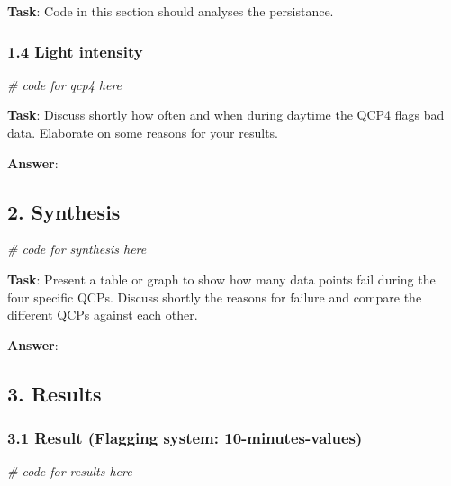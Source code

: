 \documentclass[
]{article}
\newenvironment{Shaded}{\begin{snugshade}}{\end{snugshade}}
\newcommand{\CommentTok}[1]{\textcolor[rgb]{0.56,0.35,0.01}{\textit{#1}}}
\begin{document}
\textbf{Task}: Code in this section should analyses the persistance.

\hypertarget{light-intensity}{%
\subsubsection{1.4 Light intensity}\label{light-intensity}}

\begin{Shaded}
\begin{Highlighting}[]
\CommentTok{\# code for qcp4 here}
\end{Highlighting}
\end{Shaded}

\textbf{Task}: Discuss shortly how often and when during daytime the
QCP4 flags bad data. Elaborate on some reasons for your results.

\textbf{Answer}:

\hypertarget{synthesis}{%
\subsection{2. Synthesis}\label{synthesis}}

\begin{Shaded}
\begin{Highlighting}[]
\CommentTok{\# code for synthesis here}
\end{Highlighting}
\end{Shaded}

\textbf{Task}: Present a table or graph to show how many data points
fail during the four specific QCPs. Discuss shortly the reasons for
failure and compare the different QCPs against each other.

\textbf{Answer}:

\hypertarget{results}{%
\subsection{3. Results}\label{results}}

\hypertarget{result-flagging-system-10-minutes-values}{%
\subsubsection{3.1 Result (Flagging system:
10-minutes-values)}\label{result-flagging-system-10-minutes-values}}

\begin{Shaded}
\begin{Highlighting}[]
\CommentTok{\# code for results here}
\end{Highlighting}
\end{Shaded}
\end{document}
